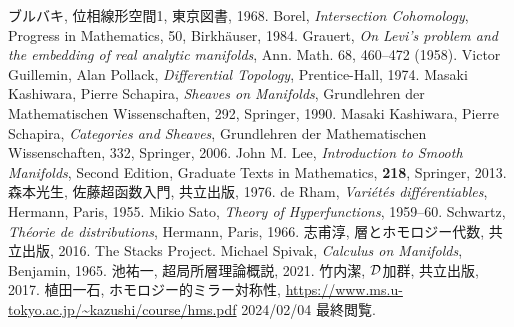 \begin{thebibliography}{20} 
     ブルバキ, 位相線形空間1, 東京図書, 1968.
     Borel, 
    \textit{Intersection Cohomology}, 
    Progress in Mathematics, 50, Birkh\"auser, 1984.
 Grauert, 
    \textit{On Levi's problem and the embedding of real analytic manifolds}, 
    Ann. Math. 68, 460--472 (1958).
 Victor Guillemin, Alan Pollack, 
    \textit{Differential Topology}, 
    Prentice-Hall, 1974.
 Masaki Kashiwara, Pierre Schapira, 
    \textit{Sheaves on Manifolds}, 
    Grundlehren der Mathematischen Wissenschaften, 292, Springer, 1990.
 Masaki Kashiwara, Pierre Schapira, 
    \textit{Categories and Sheaves}, 
    Grundlehren der Mathematischen Wissenschaften, 332, Springer, 2006.
     John M. Lee, 
    \textit{Introduction to Smooth Manifolds}, Second Edition,
    Graduate Texts in Mathematics, \textbf{218}, Springer, 2013.
     森本光生, 佐藤超函数入門, 共立出版, 1976. 
 de Rham, 
    \textit{Vari\'et\'es diff\'erentiables}, 
    Hermann, Paris, 1955.
 Mikio Sato, 
    \textit{Theory of Hyperfunctions}, 
    1959--60.
 Schwartz, 
    \textit{Th\'eorie de distributions}, 
    Hermann, Paris, 1966.
 志甫淳, 層とホモロジー代数, 共立出版, 2016.
 The Stacks Project.
 Michael Spivak, 
\textit{Calculus on Manifolds}, 
Benjamin, 1965.
 池祐一, 超局所層理論概説, 2021.
 竹内潔, \(\mathcal{D}\)加群, 共立出版, 2017.
 植田一石, ホモロジー的ミラー対称性, \url{https://www.ms.u-tokyo.ac.jp/~kazushi/course/hms.pdf} 2024/02/04 最終閲覧.

\end{thebibliography}




